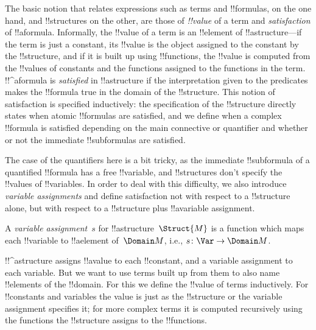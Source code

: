 \documentclass[../../../include/open-logic-section]{subfiles}
\begin{document}


\begin{explain}
The basic notion that relates expressions such as terms and
!!{formula}s, on the one hand, and !!{structure}s on the other, are
those of \emph{!!{value}} of a term and \emph{satisfaction} of 
!!a{formula}.  Informally, the !!{value} of a term is an !!{element} of
!!a{structure}---if the term is just a constant, its !!{value} is the
object assigned to the constant by the !!{structure}, and if it is
built up using !!{function}s, the !!{value} is computed from the
!!{value}s of constants and the functions assigned to the functions in
the term.  !!^a{formula} is \emph{satisfied} in !!a{structure} if the
interpretation given to the predicates makes the !!{formula} true in
the domain of the !!{structure}. This notion of satisfaction is
specified inductively: the specification of the !!{structure} directly
states when atomic !!{formula}s are satisfied, and we define when a
complex !!{formula} is satisfied depending on the main connective or
quantifier and whether or not the immediate !!{subformula}s are
satisfied. 

The case of the quantifiers here is a bit tricky, as the
immediate !!{subformula} of a quantified !!{formula} has a free
!!{variable}, and !!{structure}s don't specify the !!{value}s of
!!{variable}s.  In order to deal with this difficulty, we also
introduce \emph{variable assignments} and define satisfaction not with
respect to a !!{structure} alone, but with respect to a !!{structure}
plus !!a{variable} assignment.
\end{explain}

\begin{defn}
A \emph{variable assignment}~$s$ for !!a{structure}~$\Struct{M}$ is a
function which maps each !!{variable} to !!a{element} of~$\Domain M$,
i.e., $s\colon \Var \to \Domain M$.
\end{defn}

\begin{explain}
!!^a{structure} assigns !!a{value} to each !!{constant}, and a
variable assignment to each variable.  But we want to use terms built
up from them to also name !!{element}s of the !!{domain}.  For this we
define the !!{value} of terms inductively. For !!{constant}s and
variables the value is just as the !!{structure} or the variable
assignment specifies it; for more complex terms it is computed
recursively using the functions the !!{structure} assigns to the
!!{function}s.
\end{explain}
\end{document}
